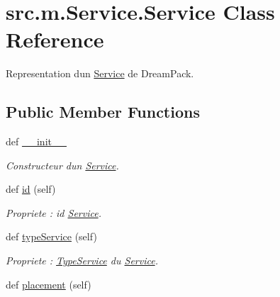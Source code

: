 \hypertarget{classsrc_1_1m_1_1_service_1_1_service}{}\section{src.\+m.\+Service.\+Service Class Reference}
\label{classsrc_1_1m_1_1_service_1_1_service}


Representation d\textquotesingle{}un \hyperlink{classsrc_1_1m_1_1_service_1_1_service}{Service} de Dream\+Pack.  


\subsection*{Public Member Functions}
\begin{DoxyCompactItemize}
\item 
def \hyperlink{classsrc_1_1m_1_1_service_1_1_service_a537535762eeb41e482be3f5d52899b29}{\+\_\+\+\_\+init\+\_\+\+\_\+}
\begin{DoxyCompactList}\small\item\em Constructeur d\textquotesingle{}un \hyperlink{classsrc_1_1m_1_1_service_1_1_service}{Service}. \end{DoxyCompactList}\item 
\hypertarget{classsrc_1_1m_1_1_service_1_1_service_a1bee742c3bdce41fc54028b764f0cfb7}{}def \hyperlink{classsrc_1_1m_1_1_service_1_1_service_a1bee742c3bdce41fc54028b764f0cfb7}{id} (self)\label{classsrc_1_1m_1_1_service_1_1_service_a1bee742c3bdce41fc54028b764f0cfb7}

\begin{DoxyCompactList}\small\item\em Propriete \+: id \hyperlink{classsrc_1_1m_1_1_service_1_1_service}{Service}. \end{DoxyCompactList}\item 
\hypertarget{classsrc_1_1m_1_1_service_1_1_service_a0f7ca738c49982801e92442e3b20da35}{}def \hyperlink{classsrc_1_1m_1_1_service_1_1_service_a0f7ca738c49982801e92442e3b20da35}{type\+Service} (self)\label{classsrc_1_1m_1_1_service_1_1_service_a0f7ca738c49982801e92442e3b20da35}

\begin{DoxyCompactList}\small\item\em Propriete \+: \hyperlink{classsrc_1_1m_1_1_service_1_1_type_service}{Type\+Service} du \hyperlink{classsrc_1_1m_1_1_service_1_1_service}{Service}. \end{DoxyCompactList}\item 
\hypertarget{classsrc_1_1m_1_1_service_1_1_service_a10358aecabfd87608fcfa4f7b112c3f8}{}def \hyperlink{classsrc_1_1m_1_1_service_1_1_service_a10358aecabfd87608fcfa4f7b112c3f8}{placement} (self)\label{classsrc_1_1m_1_1_service_1_1_service_a10358aecabfd87608fcfa4f7b112c3f8}


\end{DoxyCompactItemize}

